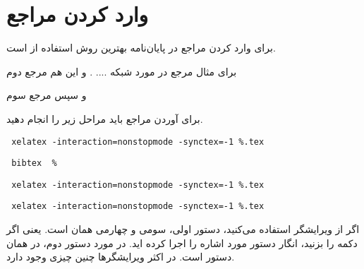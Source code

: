 \chapter{وارد کردن مراجع}
برای وارد کردن مراجع در پایان‌نامه بهترین روش استفاده از  است. 


برای مثال مرجع {\cite{Mackey2005_Effects}} در مورد شبکه .... . و این هم مرجع دوم {\cite{Kappler2009}} 

و سپس مرجع سوم {\cite{Kappler2009}}

برای آوردن مراجع باید مراحل زیر را انجام دهید.
\begin{itemize}
\begin{LTRitems}
\item
\verb+ xelatex -interaction=nonstopmode -synctex=-1 %.tex+
\item
\verb+ bibtex  % +
\item
\verb+ xelatex -interaction=nonstopmode -synctex=-1 %.tex+
\item
\verb+ xelatex -interaction=nonstopmode -synctex=-1 %.tex+
\end{LTRitems}
\end{itemize}
اگر از ویرایشگر {} استفاده می‌کنید، دستور اولی، سومی و چهارمی همان {} است. یعنی اگر دکمه {} را بزنید، انگار دستور مورد اشاره را اجرا کرده اید. در مورد دستور دوم، در {} همان دستور {} است. در اکثر ویرایشگرها چنین چیزی وجود دارد.  






